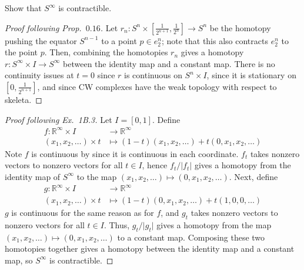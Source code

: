 \documentclass[12pt]{article}
\theoremstyle{remark}
\newcommand{\RR}{\mathbb{R}}
\begin{document}
\begin{problem}
  Show that $S^\infty$ is contractible.
\end{problem}
\begin{proof}[Proof following Prop.~$0.16$]
  Let $r_n\colon S^n \times \left[\frac{1}{2^{n+1}},\frac{1}{2^n}\right] \to
  S^n$ be the homotopy pushing the equator $S^{n-1}$ to a point $p \in e_2^n$; note
  that this also contracts $e_2^n$ to the point $p$. Then, combining the
  homotopies $r_n$ gives a homotopy $r\colon S^\infty \times I \to S^\infty$
  between the identity map and a constant map. There is no continuity issues at
  $t=0$ since $r$ is continuous on $S^n \times I$, since it is stationary on
  $\left[ 0,\frac{1}{2^{n+1}} \right]$, and since CW complexes have the weak
  topology with respect to skeleta.
\end{proof}
\begin{proof}[Proof following \emph{Ex.~1B.3}]
  Let $I = [0,1]$. Define
  \begin{align*}
    f \colon \RR^\infty \times I &\to \RR^\infty\\
    (x_1,x_2,\ldots) \times t &\mapsto (1-t)(x_1,x_2,\ldots) + t(0,x_1,x_2,\ldots)
  \end{align*}
  Note $f$ is continuous by \cite[Thm.~19.6]{Mun00} since it is continuous in
  each coordinate. $f_t$ takes nonzero vectors to nonzero vectors for all
  $t \in I$, hence $f_t/\lvert f_t \rvert$ gives a homotopy from the identity map
  of $S^\infty$ to the map $(x_1,x_2,\ldots) \mapsto (0,x_1,x_2,\ldots)$.
  Next, define
  \begin{align*}
    g \colon \RR^\infty \times I &\to \RR^\infty\\
    (x_1,x_2,\ldots) \times t &\mapsto (1-t)(0,x_1,x_2,\ldots) + t(1,0,0,\ldots)
  \end{align*}
  $g$ is continuous for the same reason as for $f$, and $g_t$ takes nonzero
  vectors to nonzero vectors for all $t\in I$. Thus, $g_t/\lvert g_t \rvert$
  gives a homotopy from the map $(x_1,x_2,\ldots) \mapsto (0,x_1,x_2,\ldots)$ to
  a constant map. Composing these two homotopies together gives a homotopy
  between the identity map and a constant map, so $S^\infty$ is contractible.
\end{proof}
\end{document}
